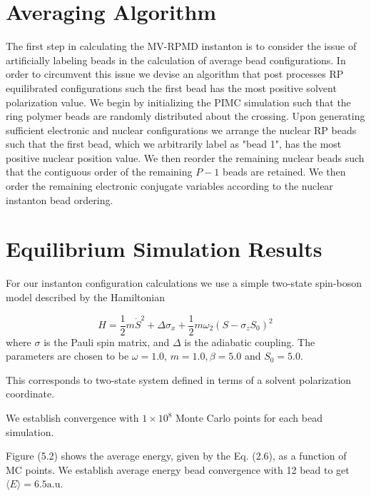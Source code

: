 \documentclass[phd,tocprelim]{cornell}
\begin{document}
\section{Averaging Algorithm}
The first step in calculating the MV-RPMD instanton is to consider the issue of artificially labeling beads in the calculation of average bead configurations. In order to circumvent this issue we devise an algorithm that post processes RP equilibrated configurations such the first bead has the most positive solvent polarization value. We begin by initializing the PIMC simulation such that the ring polymer beads are randomly distributed about the crossing. Upon generating sufficient electronic and nuclear configurations we arrange the nuclear RP beads such that the first bead, which we arbitrarily label as "bead 1", has the most positive nuclear position value. We then reorder the remaining nuclear beads such that the contiguous order of the remaining $P-1$ beads are retained. We then order the remaining electronic conjugate variables according to the nuclear instanton bead ordering. 

\section{Equilibrium Simulation Results}
For our instanton configuration calculations we use a simple two-state spin-boson model described by the Hamiltonian  ~\cite{CAO1995}


\begin{equation}
H = \frac{1}{2} m \dot{S}^2 + \Delta \sigma_x + \frac{1}{2} m \omega_2 (S-\sigma_zS_0)^2 
\end{equation}
where $\sigma$ is the Pauli spin matrix, and $\Delta$ is the adiabatic coupling. The parameters are chosen to be $\omega = 1.0$, $m=1.0, \beta=5.0$ and $S_0=5.0$.

This corresponds to two-state system defined in terms of a solvent polarization coordinate. 

We establish convergence with $1\times 10^8$ Monte Carlo points for each bead simulation. 


Figure (5.2) shows the average energy, given by the Eq. (2.6), as a function of MC points. We establish average energy bead convergence with 12 bead to get $\langle E\rangle= 6.5 \textrm{a.u.}$
\end{document}
